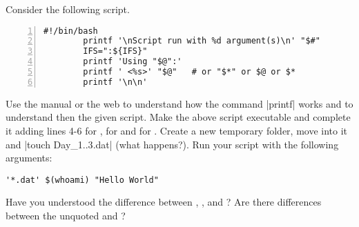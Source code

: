 
    Consider the following script.
    \begin{lstlisting}[style=MyBash, numbers=left]
        #!/bin/bash
        printf '\nScript run with %d argument(s)\n' "$#"
        IFS=":${IFS}"
        printf 'Using "$@":'
        printf ' <%s>' "$@"   # or "$*" or $@ or $*
        printf '\n\n'
    \end{lstlisting}
    Use the manual or the web to understand how the command \bash|printf| works and to understand then the given script.
    Make the above script executable and complete it adding lines 4-6 for , for  and for \bash{$*}.
    Create a new temporary folder, move into it and \bash|touch Day_{1..3}.dat| (what happens?).
    Run your script with the following arguments:
    \begin{lstlisting}[style=MyBash]
        '*.dat' $(whoami) "Hello World"
    \end{lstlisting}
    Have you understood the difference between , ,  and \bash{$*}?
    Are there differences between the unquoted  and \bash{$*}?
\EndExercise[DodgerBlue]